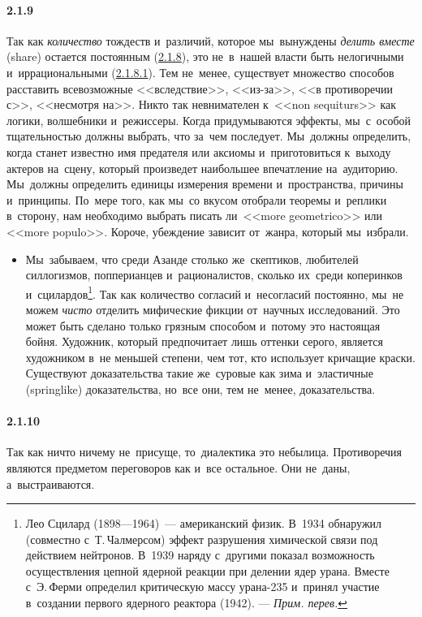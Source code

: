 \paragraph{2.1.9}\hypertarget{par:2.1.9}{} Так как {\itshape количество} тождеств и~различий, которое мы~вынуждены {\itshape делить вместе} (share) остается постоянным (\hyperlink{par:2.1.8}{2.1.8}), это не~в~нашей власти быть нелогичными и~иррациональными (\hyperlink{par:2.1.8.1}{2.1.8.1}). Тем не~менее, существует множество способов расставить всевозможные <<вследствие>>, <<из-за>>, <<в противоречии с>>, <<несмотря на>>. Никто так невнимателен к~<<non sequiturs>> как логики, волшебники и~режиссеры. Когда придумываются эффекты, мы~с~особой тщательностью должны выбрать, что за~чем последует. Мы~должны определить, когда станет известно имя предателя или аксиомы и~приготовиться к~выходу актеров на~сцену, который произведет наибольшее впечатление на~аудиторию. Мы~должны определить единицы измерения времени и~пространства, причины и~принципы. По~мере того, как мы~со вкусом отобрали теоремы и~реплики в~сторону, нам необходимо выбрать писать ли~<<more geometrico>> или <<more populo>>. Короче, убеждение зависит от~жанра, который мы~избрали.
	\begin{itemize}
	\item 
 Мы~забываем, что среди Азанде столько же~скептиков, любителей силлогизмов, попперианцев и~рационалистов, сколько их~среди коперинков и~сцилардов\footnote{Лео Сцилард (1898---1964)~--- американский физик. В~1934 обнаружил (совместно с~Т.\,Чалмерсом) эффект разрушения химической связи под действием нейтронов. В~1939 наряду с~другими показал возможность осуществления цепной ядерной реакции при делении ядер урана. Вместе с~Э.\,Ферми определил критическую массу урана-235 и~принял участие в~создании первого ядерного реактора (1942). --- {\itshape Прим. перев.}}. Так как количество согласий и~несогласий постоянно, мы~не можем {\itshape чисто} отделить мифические фикции от~научных исследований. Это может быть сделано только грязным способом и~потому это настоящая бойня. Художник, который предпочитает лишь оттенки серого, является художником в~не меньшей степени, чем тот, кто использует кричащие краски. Существуют доказательства такие же~суровые как зима и~эластичные (springlike) доказательства, но~все они, тем не~менее, доказательства.
	\end{itemize}

\paragraph{2.1.10}\hypertarget{par:2.1.10}{} Так как ничто ничему не~присуще, то~диалектика это небылица. Противоречия являются предметом переговоров как и~все остальное. Они не~даны, а~выстраиваются.

